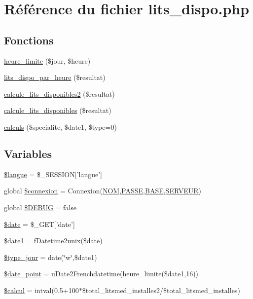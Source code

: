 \hypertarget{lits__dispo_8php}{
\section{R\'{e}f\'{e}rence du fichier lits\_\-dispo.php}
\label{lits__dispo_8php}
}
\subsection*{Fonctions}
\begin{CompactItemize}
\item 
\hyperlink{lits__dispo_8php_a8}{heure\_\-limite} (\$jour, \$heure)
\item 
\hyperlink{lits__dispo_8php_a9}{lits\_\-dispo\_\-par\_\-heure} (\$resultat)
\item 
\hyperlink{lits__dispo_8php_a10}{calcule\_\-lits\_\-disponibles2} (\$resultat)
\item 
\hyperlink{lits__dispo_8php_a11}{calcule\_\-lits\_\-disponibles} (\$resultat)
\item 
\hyperlink{lits__dispo_8php_a12}{calculs} (\$specialite, \$date1, \$type=0)
\end{CompactItemize}
\subsection*{Variables}
\begin{CompactItemize}
\item 
\hyperlink{lits__dispo_8php_a0}{\$langue} = \$\_\-SESSION\mbox{[}'langue'\mbox{]}
\item 
global \hyperlink{lits__dispo_8php_a1}{\$connexion} = Connexion(\hyperlink{pma__connect_8php_a0}{NOM},\hyperlink{pma__connect_8php_a1}{PASSE},\hyperlink{pma__connect_8php_a3}{BASE},\hyperlink{pma__connect_8php_a2}{SERVEUR})
\item 
global \hyperlink{lits__dispo_8php_a2}{\$DEBUG} = false
\item 
\hyperlink{lits__dispo_8php_a3}{\$date} = \$\_\-GET\mbox{[}'date'\mbox{]}
\item 
\hyperlink{lits__dispo_8php_a4}{\$date1} = f\-Datetime2unix(\$date)
\item 
\hyperlink{lits__dispo_8php_a5}{\$type\_\-jour} = date(\char`\"{}w\char`\"{},\$date1)
\item 
\hyperlink{lits__dispo_8php_a6}{\$date\_\-point} = u\-Date2Frenchdatetime(heure\_\-limite(\$date1,16))
\item 
\hyperlink{lits__dispo_8php_a7}{\$calcul} = intval(0.5+100$\ast$\$total\_\-litsmed\_\-installes2/\$total\_\-litsmed\_\-installes)
\end{CompactItemize}


